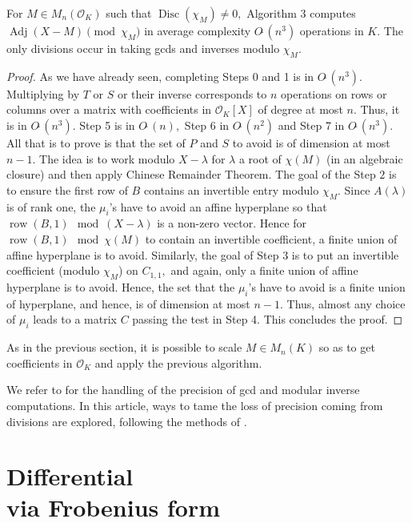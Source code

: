 \documentclass{sig-alternate-05-2015}
\DeclareMathOperator{\adj}{Adj}
\DeclareMathOperator{\disc}{Disc}
\DeclareMathOperator{\row}{row}
\newcommand{\OK}{\mathcal{O}_K}
\newcommand{\softO}{O\tilde{~}}
\begin{document}
\begin{theo}
\label{thm:alg3}
For $M \in M_n(\OK)$ such that $\disc( \chi_M) \neq 0,$
Algorithm 3 computes
$\adj (X-M) \pmod{\chi_M}$ in average complexity $\softO (n^3)$
operations in $K$.
The only divisions occur in taking gcds and inverses modulo $\chi_M$.
\end{theo}
\begin{proof}
As we have already seen, completing Steps 0 and 1 is in $\softO (n^3).$
Multiplying by $T$ or $S$ or their inverse corresponds
to $n$ operations on rows or columns over a matrix with coefficients
in $\OK[X]$ of degree at most $n.$
Thus, it is in $\softO (n^3).$
Step 5 is in $\softO (n),$ Step 6 in $\softO(n^2)$ and Step 7 in $\softO(n^3)$.
All that is to prove is that the set of $P$ and $S$ to avoid
is of dimension at most $n-1.$
The idea is to work modulo $X-\lambda$
for $\lambda$ a root of $\chi (M)$ (in an algebraic closure)
and then apply Chinese Remainder Theorem.
The goal of the Step $2$ is to ensure the first row of $B$ contains an
invertible entry modulo $\chi_M.$
Since $A(\lambda)$ is of rank one, the $\mu_i$'s have to avoid an
affine hyperplane so that $\row(B,1) \mod (X-\lambda)$ is a non-zero vector.
Hence for $\row(B,1) \mod \chi (M)$ to contain an invertible coefficient,
a finite union of affine hyperplane is to avoid.
Similarly, the goal of Step 3 is to put an invertible coefficient (modulo
$\chi_M$) on $C_{1,1},$ and again, only a finite union of affine
hyperplane is to avoid.
Hence, the set that the $\mu_i$'s have to avoid is a finite union
of hyperplane, and hence, is of dimension at most $n-1.$
Thus, almost any choice of $\mu_i$ leads to a matrix $C$ passing the test
in Step 4.
This concludes the proof.
\end{proof}


\begin{rem}
As in the previous section, it is possible
to scale $M \in M_n(K)$ so as to
get coefficients in $\OK$ and apply the previous algorithm.
\end{rem}
\begin{rem}
We refer to \cite{caruso:15a} for the handling
of the precision of gcd and modular inverse computations.
In this article, ways to tame the loss of precision
coming from divisions are explored, following
the methods of \cite{caruso-roe-vaccon:14a}.
\end{rem}


\section{Differential\\via Frobenius form}
\label{sec:diffFrob}
\end{document}
